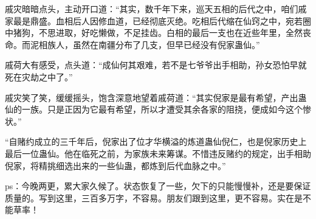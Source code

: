 \begin{this_body}
戚灾暗暗点头，主动开口道：“其实，数千年下来，巡天五相的后代之中，咱们戚家最是鼎盛。血相后人因修血道，已经彻底灭绝。吃相后代缩在仙窍之中，宛若圈中猪狗，不思进取，好吃懒做，不足挂齿。白相的最后一支也在近些年里，全然丧命。而泥相族人，虽然在南疆分布了几支，但早已经没有倪家蛊仙。”

戚荷大有感受，点头道：“成仙何其艰难，若不是七爷爷出手相助，孙女恐怕早就死在灾劫之中了。”

戚灾笑了笑，缓缓摇头，饱含深意地望着戚荷道：“其实倪家是最有希望，产出蛊仙的一族。只是正因为它最有希望，所以才遭受其余各家的阻挠，便成如今这个惨状。”

“自赌约成立的三千年后，倪家出了位才华横溢的炼道蛊仙倪仁，也是倪家历史上最后一位蛊仙。他在临死之前，为家族未来筹谋。不惜违反赌约的规定，出手相助倪家，将精挑细选出来的一些仙蛊，都炼到后代血脉之中。”

ps：今晚两更，累大家久候了。状态恢复了一些，欠下的只能慢慢补，还是要保证质量的。写到这里，三百多万字，不容易。朋友们跟到这里，更不容易。实在是不能草率！

\end{this_body}


